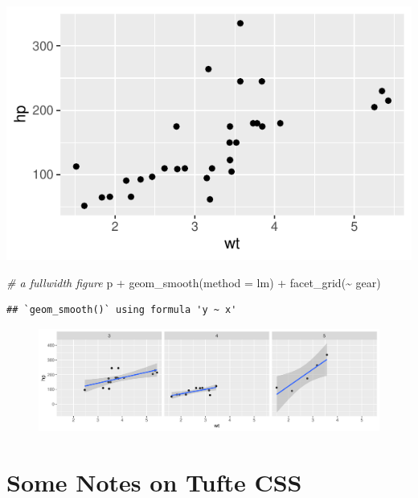 \documentclass[]{tufte-handout}
\newenvironment{Shaded}{}{}
\newcommand{\AttributeTok}[1]{\textcolor[rgb]{0.49,0.56,0.16}{#1}}
\newcommand{\CommentTok}[1]{\textcolor[rgb]{0.38,0.63,0.69}{\textit{#1}}}
\newcommand{\FunctionTok}[1]{\textcolor[rgb]{0.02,0.16,0.49}{#1}}
\newcommand{\NormalTok}[1]{#1}
\newcommand{\SpecialCharTok}[1]{\textcolor[rgb]{0.25,0.44,0.63}{#1}}
\newcommand{\StringTok}[1]{\textcolor[rgb]{0.25,0.44,0.63}{#1}}
\begin{document}
\includegraphics{tufte_files/figure-latex/fig-nocap-main-1}

\begin{Shaded}
\begin{Highlighting}[]
\CommentTok{\# a fullwidth figure}
\NormalTok{p }\SpecialCharTok{+} \FunctionTok{geom\_smooth}\NormalTok{(}\AttributeTok{method =} \StringTok{\textquotesingle{}lm\textquotesingle{}}\NormalTok{) }\SpecialCharTok{+} \FunctionTok{facet\_grid}\NormalTok{(}\SpecialCharTok{\textasciitilde{}}\NormalTok{ gear)}
\end{Highlighting}
\end{Shaded}

\begin{verbatim}
## `geom_smooth()` using formula 'y ~ x'
\end{verbatim}

\begin{figure}
\includegraphics{tufte_files/figure-latex/fig-nocap-fullwidth-1} \end{figure}

\hypertarget{some-notes-on-tufte-css}{%
\section{Some Notes on Tufte CSS}\label{some-notes-on-tufte-css}}
\end{document}
